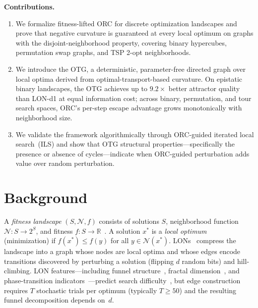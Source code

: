 \documentclass[runningheads]{llncs}
\begin{document}
\textbf{Contributions.}
\begin{enumerate}
\item We formalize fitness-lifted ORC for discrete optimization landscapes and prove that negative curvature is guaranteed at every local optimum on graphs with the disjoint-neighborhood property, covering binary hypercubes, permutation swap graphs, and TSP 2-opt neighborhoods.
\item We introduce the OTG, a deterministic, parameter-free directed graph over local optima derived from optimal-transport-based curvature.
On epistatic binary landscapes, the OTG achieves up to $9.2\times$ better attractor quality than LON-d1 at equal information cost; across binary, permutation, and tour search spaces, ORC's per-step escape advantage grows monotonically with neighborhood size.
\item We validate the framework algorithmically through ORC-guided iterated local search~(ILS) and show that OTG structural properties---specifically the presence or absence of cycles---indicate when ORC-guided perturbation adds value over random perturbation.
\end{enumerate}


\section{Background}
\label{sec:background}

A \emph{fitness landscape} $(S, \mathcal{N}, f)$ consists of solutions $S$, neighborhood function $\mathcal{N}\!: S \to 2^S$, and fitness $f\!: S \to \mathbb{R}$~\cite{stadler1996landscapes}.
A solution $x^*$ is a \emph{local optimum} (minimization) if $f(x^*) \le f(y)$ for all $y \in \mathcal{N}(x^*)$.
LONs~\cite{ochoa2008first,ochoa2016local} compress the landscape into a graph whose nodes are local optima and whose edges encode transitions discovered by perturbing a solution (flipping $d$ random bits) and hill-climbing.
LON features---including funnel structure~\cite{ochoa2016funnels}, fractal dimension~\cite{thomson2022fractal}, and phase-transition indicators~\cite{ochoa2020maxsat}---predict search difficulty~\cite{ochoa2017understanding}, but edge construction requires $T$ stochastic trials per optimum (typically $T\!\ge\!50$) and the resulting funnel decomposition depends on~$d$.
\end{document}
